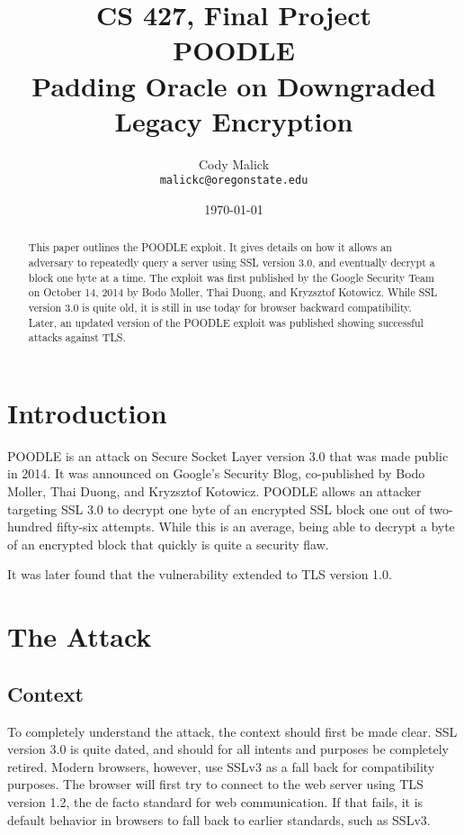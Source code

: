 \documentclass[10pt]{article}
\begin{document}
\title{CS 427, Final Project\\ POODLE\\ Padding Oracle on Downgraded Legacy
Encryption}
\author{Cody Malick\\
\texttt{malickc@oregonstate.edu}}
\date{\today}
\maketitle
\vspace{4cm}

\begin{abstract}
	This paper outlines the POODLE exploit. It gives details on how it
	allows an adversary to repeatedly query a server using SSL version 3.0,
	and eventually decrypt a block one byte at a time. The exploit was
	first published by the
	Google Security Team on October 14, 2014 by Bodo Moller, Thai Duong,
	and Kryzsztof Kotowicz. While SSL version 3.0 is quite old, it is still
	in use today for browser backward compatibility. Later, an updated
	version of the POODLE exploit was published showing successful attacks
	against TLS.

\end{abstract}

\clearpage

\section*{Introduction}
POODLE is an attack on Secure Socket Layer version 3.0 that was made public
in 2014. It was announced on Google's Security Blog, co-published by Bodo Moller,
Thai Duong, and Kryzsztof Kotowicz. POODLE allows an attacker targeting SSL 3.0
to decrypt one byte of an encrypted SSL block one out of two-hundred fifty-six 
attempts. While this is an average, being able to decrypt a byte of an encrypted
block that quickly is quite a security flaw.\cite{POODLE}

It was later found that the vulnerability extended to TLS version 1.0.

\section*{The Attack}
\subsection*{Context}
To completely understand the attack, the context should first be made clear. 
SSL version 3.0 is quite dated, and should for all intents and purposes be 
completely retired. Modern browsers, however, use SSLv3 as a fall back for
compatibility purposes. The browser will first try to connect to the web server
using TLS version 1.2, the de facto standard for web communication. If that fails,
it is default behavior in browsers to fall back to earlier standards, such as SSLv3.\cite{POODLE}
\end{document}
